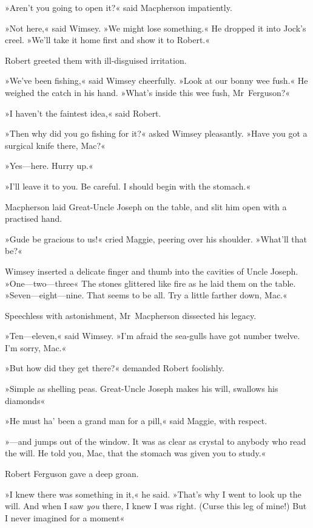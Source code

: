 »Aren't you going to open it?« said Macpherson impatiently.

»Not here,« said Wimsey. »We might lose something.« He dropped it into Jock's creel. »We'll take it home first and show it to Robert.«

Robert greeted them with ill-disguised irritation.

»We've been fishing,« said Wimsey cheerfully. »Look at our bonny wee fush.« He weighed the catch in his hand. »What's inside this wee fush, Mr~Ferguson?«

»I haven't the faintest idea,« said Robert.

»Then why did you go fishing for it?« asked Wimsey pleasantly. »Have you got a surgical knife there, Mac?«

»Yes—here. Hurry up.«

»I'll leave it to you. Be careful. I should begin with the stomach.«

Macpherson laid Great-Uncle Joseph on the table, and slit him open with a practised hand.

»Gude be gracious to us!« cried Maggie, peering over his shoulder. »What'll that be?«

Wimsey inserted a delicate finger and thumb into the cavities of Uncle Joseph. »One—two—three\longdash« The stones glittered like fire as he laid them on the table. »Seven—eight—nine. That seems to be all. Try a little farther down, Mac.«

Speechless with astonishment, Mr~Macpherson dissected his legacy.

»Ten—eleven,« said Wimsey. »I'm afraid the sea-gulls have got number twelve. I'm sorry, Mac.«

»But how did they get there?« demanded Robert foolishly.

»Simple as shelling peas. Great-Uncle Joseph makes his will, swallows his diamonds\longdash«

»He must ha' been a grand man for a pill,« said Maggie, with respect.

»—and jumps out of the window. It was as clear as crystal to anybody who read the will. He told you, Mac, that the stomach was given you to study.«

Robert Ferguson gave a deep groan.

»I knew there was something in it,« he said. »That's why I went to look up the will. And when I saw \textit{you} there, I knew I was right. (Curse this leg of mine!) But I never imagined for a moment\longdash«

